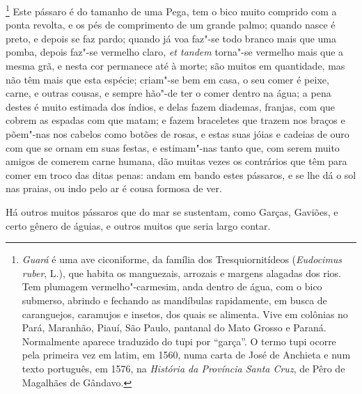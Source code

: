 \begin{linenumbers}
\footnote{ \textit{Guará} é uma ave ciconiforme, da
família dos Tresquiornitídeos (\textit{Eudocimus ruber}, L.), que
habita os manguezais, arrozais e margens alagadas dos rios. Tem
plumagem vermelho"-carmesim, anda dentro de água, com o bico submerso,
abrindo e fechando as mandíbulas rapidamente, em busca de caranguejos,
caramujos e insetos, dos quais se alimenta. Vive em colônias no Pará,
Maranhão, Piauí, São Paulo, pantanal do Mato Grosso e Paraná.
Normalmente aparece traduzido do tupi por ``garça''. O termo tupi ocorre
pela primeira vez em latim, em 1560, numa carta de José de
Anchieta e num texto português, em 1576, na \textit{História da
Província Santa Cruz}, de Pêro de Magalhães de Gândavo.} Este
pássaro é do tamanho de uma Pega, tem o bico muito comprido com a ponta
revolta, e os pés de comprimento de um grande palmo; quando nasce é
preto, e depois se faz pardo; quando já voa faz"-se todo branco mais que
uma pomba, depois faz"-se vermelho claro, \textit{et tandem} torna"-se vermelho mais que a mesma grã, e
nesta cor permanece até à morte; são muitos em quantidade, mas não têm 
mais que esta espécie; criam"-se bem em casa, o seu comer é peixe,
carne, e outras cousas, e sempre hão"-de ter o comer dentro na água; a
pena destes é muito estimada dos índios, e delas fazem diademas,
franjas, com que cobrem as espadas com que matam; e fazem braceletes
que trazem nos braços e põem"-nas nos cabelos como botões de rosas, e
estas suas jóias e cadeias de ouro com que se ornam em suas festas, e 
estimam"-nas tanto que, com serem muito amigos de comerem carne humana,
dão muitas vezes os contrários que têm para comer em troco das ditas 
penas: andam em bando estes pássaros, e se lhe dá o sol nas praias, ou
indo pelo ar é cousa formosa de ver.

 Há outros muitos pássaros que do mar se sustentam, como Garças,
Gaviões, e certo gênero de águias, e outros muitos que seria largo contar.


\end{linenumbers}

